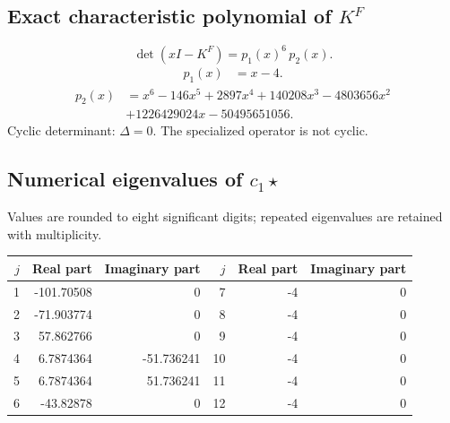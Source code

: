 \documentclass[10pt,a4paper]{article}
\begin{document}
\subsection*{Exact characteristic polynomial of $K^F$}
\[\det(xI-K^F)=p_{1}(x)^{6}\,p_{2}(x).\]
\[\begin{aligned}p_{1}(x)&=x - 4.\end{aligned}\]
\[\begin{aligned}p_{2}(x)&=x^{6} - 146 x^{5} + 2897 x^{4} + 140208 x^{3} - 4803656 x^{2}\\&+1226429024 x - 50495651056.\end{aligned}\]
Cyclic determinant: $\Delta=0$. The specialized operator is not cyclic.
\subsection*{Numerical eigenvalues of $c_1\star$}
Values are rounded to eight significant digits; repeated eigenvalues are retained with multiplicity.
\begin{center}\small\begin{tabular}{rrr@{\qquad}rrr}\toprule $j$ & Real part & Imaginary part & $j$ & Real part & Imaginary part\\\midrule
1 & -101.70508 & 0 & 7 & -4 & 0\\
2 & -71.903774 & 0 & 8 & -4 & 0\\
3 & 57.862766 & 0 & 9 & -4 & 0\\
4 & 6.7874364 & -51.736241 & 10 & -4 & 0\\
5 & 6.7874364 & 51.736241 & 11 & -4 & 0\\
6 & -43.82878 & 0 & 12 & -4 & 0\\
\bottomrule\end{tabular}\end{center}
\end{document}
